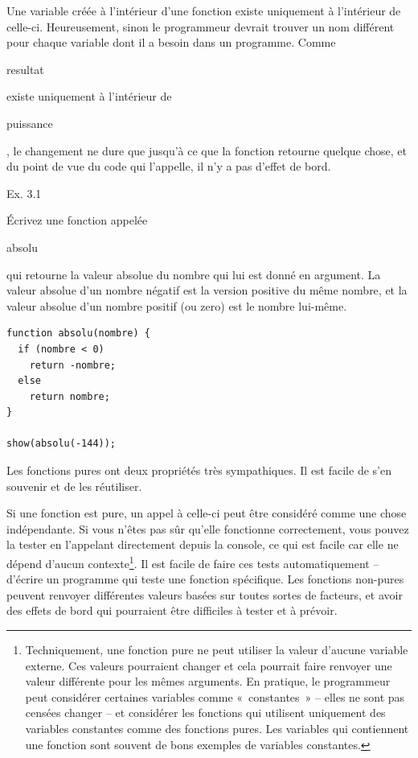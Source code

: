 \documentclass{FramateX}
\renewcommand{\texttt}[1]{\begin{sffamily}{#1}\end{sffamily}}
\begin{document}
Une variable créée à l'intérieur d'une fonction existe uniquement à
l'intérieur de celle-ci. Heureusement, sinon le programmeur devrait
trouver un nom différent pour chaque variable dont il a besoin dans un
programme. Comme \texttt{resultat} existe uniquement à l'intérieur de
\texttt{puissance}, le changement ne dure que jusqu'à ce que la fonction
retourne quelque chose, et du point de vue du code qui l'appelle, il n'y
a pas d'effet de bord.

\begin{center}\end{center}

Ex. 3.1

Écrivez une fonction appelée \texttt{absolu} qui retourne la valeur
absolue du nombre qui lui est donné en argument. La valeur absolue d'un
nombre négatif est la version positive du même nombre, et la valeur
absolue d'un nombre positif (ou zero) est le nombre lui-même.

\begin{lstlisting}
function absolu(nombre) {
  if (nombre < 0)
    return -nombre;
  else
    return nombre;
}

show(absolu(-144));
\end{lstlisting}
\begin{center}\end{center}

Les fonctions pures ont deux propriétés très sympathiques. Il est facile
de s'en souvenir et de les réutiliser.

Si une fonction est pure, un appel à celle-ci peut être considéré comme
une chose indépendante. Si vous n'êtes pas sûr qu'elle fonctionne
correctement, vous pouvez la tester en l'appelant directement depuis la
console, ce qui est facile car elle ne dépend d'aucun
contexte\footnote{Techniquement, une fonction pure ne peut utiliser la valeur d'aucune variable externe. Ces valeurs pourraient changer et cela pourrait faire renvoyer une valeur différente pour les mêmes arguments. En pratique, le programmeur peut considérer certaines variables comme «~constantes~» -- elles ne sont pas censées changer -- et considérer les fonctions qui utilisent uniquement des variables constantes comme des fonctions pures. Les variables qui contiennent une fonction sont souvent de bons exemples de variables constantes.}. Il est facile de faire ces tests
automatiquement -- d'écrire un programme qui teste une fonction
spécifique. Les fonctions non-pures peuvent renvoyer différentes valeurs
basées sur toutes sortes de facteurs, et avoir des effets de bord qui
pourraient être difficiles à tester et à prévoir.
\end{document}
